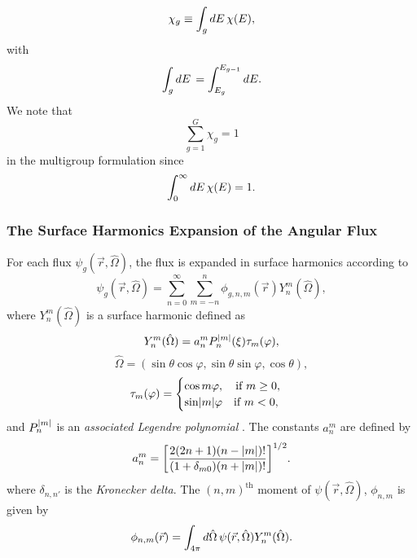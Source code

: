 \begin{equation}
	\chi_{g} \equiv \int_{g} \mathop{}\!d E \, \chi(E),
\end{equation}
with
\begin{equation}
	\int_{g} \mathop{}\!d E \, = \int_{E_{g}}^{E_{g-1}} \mathop{}\!d E.
\end{equation}
We note that 
\begin{equation}
	\sum_{g=1}^{G} \chi_{g} = 1
\end{equation}
in the multigroup formulation since
\begin{equation}
	\int_{0}^{\infty} \mathop{}\!d E \, \chi(E) = 1.
\end{equation}

\subsubsection{The Surface Harmonics Expansion of the Angular Flux}

For each flux $\psi_{g}(\vec{r},\hat{\Omega})$, the flux is expanded in surface harmonics according to
\begin{equation}
	\psi_{g}(\vec{r},\hat{\Omega}) = \sum_{n=0}^{\infty} \sum_{m=-n}^{n} \phi_{g,n,m}(\vec{r}) Y_{n}^{m}(\hat{\Omega}),
\end{equation}
where $Y_{n}^{m}(\hat{\Omega})$ is a surface harmonic defined as
\begin{equation}
	Y_{n}^{m}(\hat{\Omega}) = a_{n}^{m} P_{n}^{\lvert m\rvert}(\xi) \tau_{m}(\varphi),
\end{equation}
\begin{equation}
\hat{\Omega} = (\sin \theta \cos \varphi, \sin \theta \sin \varphi, \cos \theta),
\end{equation}
\begin{equation}
	\tau_{m}(\varphi) = \begin{cases}
					\cos m\varphi, \quad \text{if } m \geq 0, \\
					\sin \lvert m\rvert \varphi \quad \text{if } m < 0,
				      \end{cases}
\end{equation}
and $P_{n}^{\lvert m\rvert}$ is an \textit{associated Legendre polynomial} \cite{duderstadt_nuclear_1976}. The constants $a_{n}^{m}$ are defined by
\begin{equation}
	a_{n}^{m} = \bigg [ \frac{2(2n+1)(n-\lvert m\rvert)!}{(1+\delta_{m0})(n + \lvert m\rvert)!} \bigg ]^{1/2}.
\end{equation}
where $\delta_{n,n'}$ is the \textit{Kronecker delta}. The $(n,m)^{\text{th}}$ moment of $\psi(\vec{r}, \hat{\Omega})$, $\phi_{n,m}$ is given by
\begin{equation}
	\phi_{n,m}(\vec{r}) = \int_{4\pi} \mathop{}\!d \hat{\Omega} \, \psi(\vec{r},\hat{\Omega}) Y_{n}^{m}(\hat{\Omega}).
\end{equation}


